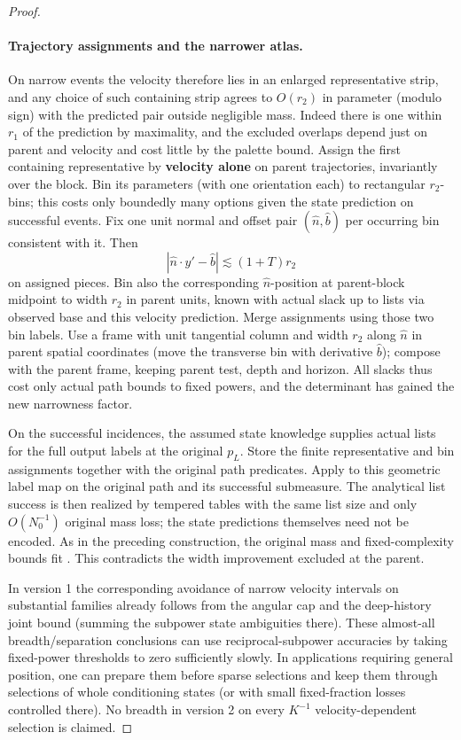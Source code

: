 \begin{proof}
\paragraph{Trajectory assignments and the narrower atlas.}
On narrow events the velocity therefore lies in an enlarged representative strip, and any choice of such containing strip agrees to \(O(r_2)\) in parameter (modulo sign) with the predicted pair outside negligible mass. Indeed there is one within \(r_1\) of the prediction by maximality, and the excluded overlaps depend just on parent and velocity and cost little by the palette bound. Assign the first containing representative by \textbf{velocity alone} on parent trajectories, invariantly over the block. Bin its parameters (with one orientation each) to rectangular \(r_2\)-bins; this costs only boundedly many options given the state prediction on successful events. Fix one unit normal and offset pair \((\hat n,\hat b)\) per occurring bin consistent with it. Then
\begin{equation}
|\hat n\cdot y'-\hat b|\lesssim (1+T)r_2
\end{equation}
on assigned pieces. Bin also the corresponding \(\hat n\)-position at parent-block midpoint to width \(r_2\) in parent units, known with actual slack up to lists via observed base and this velocity prediction. Merge assignments using those two bin labels. Use a frame with unit tangential column and width \(r_2\) along \(\hat n\) in parent spatial coordinates (move the transverse bin with derivative \(\hat b\)); compose with the parent frame, keeping parent test, depth and horizon. All slacks thus cost only actual path bounds to fixed powers, and the
determinant has gained the new narrowness factor.

On the successful incidences, the assumed state knowledge supplies
actual lists for the full output labels at the original \(p_L\).
Store the finite representative and bin assignments together with the
original path predicates.  Apply  to this
geometric label map on the original path and its successful submeasure.
The analytical list success is then realized by tempered tables with
the same list size and only \(O(N_0^{-1})\) original mass loss; the
state predictions themselves need not be encoded.  As in the preceding construction, the original mass and
fixed-complexity bounds fit .  This contradicts
the width improvement excluded at the parent.

In version 1 the corresponding avoidance of narrow velocity intervals on substantial families already follows from the angular cap and the deep-history joint bound (summing the subpower state ambiguities there). These almost-all breadth/separation conclusions can use reciprocal-subpower accuracies by taking fixed-power thresholds to zero sufficiently slowly. In applications requiring general position, one can prepare them before sparse selections and keep them through selections of whole conditioning states (or with small fixed-fraction losses controlled there). No breadth in version 2 on every \(K^{-1}\) velocity-dependent selection is claimed.

\end{proof}
